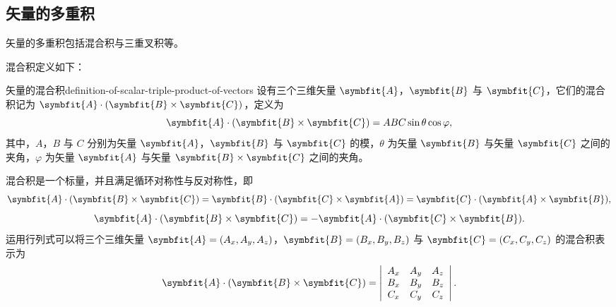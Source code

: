 \subsection{矢量的多重积}\label{subsec:multiple-product-of-vectors}

矢量的多重积包括混合积与三重叉积等。

混合积定义如下：
\begin{definition}{矢量的混合积}{definition-of-scalar-triple-product-of-vectors}
    设有三个三维矢量 $ \symbfit{A} $，$ \symbfit{B} $ 与 $ \symbfit{C} $，它们的混合积记为 $ \symbfit{A} \cdot (\symbfit{B} \times \symbfit{C}) $，定义为
    \begin{equation}
        \symbfit{A} \cdot (\symbfit{B} \times \symbfit{C}) = ABC \sin \theta \cos \varphi ,
    \end{equation}
    其中，$ A $，$ B $ 与 $ C $ 分别为矢量 $ \symbfit{A} $，$ \symbfit{B} $ 与 $ \symbfit{C} $ 的模，$ \theta $ 为矢量 $ \symbfit{B} $ 与矢量 $ \symbfit{C} $ 之间的夹角，$ \varphi $ 为矢量 $ \symbfit{A} $ 与矢量 $ \symbfit{B} \times \symbfit{C} $ 之间的夹角。
\end{definition}
混合积是一个标量，并且满足循环对称性与反对称性，即
\begin{equation}
    \symbfit{A} \cdot (\symbfit{B} \times \symbfit{C}) = \symbfit{B} \cdot (\symbfit{C} \times \symbfit{A}) = \symbfit{C} \cdot (\symbfit{A} \times \symbfit{B}) ,
\end{equation}
\begin{equation}
    \symbfit{A} \cdot (\symbfit{B} \times \symbfit{C}) = - \symbfit{A} \cdot (\symbfit{C} \times \symbfit{B}) .
\end{equation}
运用行列式可以将三个三维矢量 $ \symbfit{A} = (A_x , A_y , A_z) $，$ \symbfit{B} = (B_x , B_y , B_z) $ 与 $ \symbfit{C} = (C_x , C_y , C_z) $ 的混合积表示为
\begin{equation}
    \symbfit{A} \cdot (\symbfit{B} \times \symbfit{C}) = \left| \begin{array}{ccc}
        A_x & A_y & A_z \\
        B_x & B_y & B_z \\
        C_x & C_y & C_z
    \end{array} \right| .
\end{equation}

